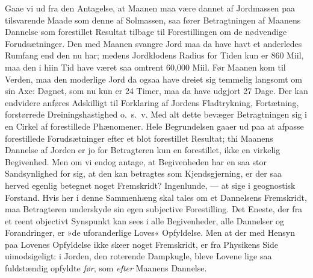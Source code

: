 \documentclass[12pt]{book}
\newcommand{\apage}[1]{\marginnote{\footnotesize\textit{[#1]}}}
\begin{document}
Gaae vi ud fra den Antagelse, at Maanen maa være dannet af Jordmassen paa
tilsvarende Maade som denne af Solmassen, saa fører Betragtningen af
Maanens Dannelse som forestillet Resultat tilbage til Forestillingen om de
nødvendige Forudsætninger. Den med Maanen svangre Jord maa da have havt et
anderledes Rumfang end den nu har; medens Jordklodens Radius for Tiden kun
er 860 Miil, maa den i hiin Tid have været saa omtrent 60,000 Miil. Før
Maanen kom til Verden, maa den moderlige Jord da ogsaa have dreiet sig
temmelig langsomt om sin Axe: Døgnet, som nu kun er 24 Timer, maa da have
udgjort 27 Dage. Der kan endvidere anføres Adskilligt til Forklaring af
Jordens Fladtrykning, Fortætning, forstørrede Dreiningshastighed o.\ s.\ v. Med
alt dette bevæger Betragtningen sig i en Cirkel af forestillede Phænomener.
Hele Begrundelsen gaaer ud paa at afpasse forestillede Forudsætninger efter
et blot forestillet Resultat; thi Maanens Dannelse af Jorden er jo for
Betragteren kun en forestillet, ikke en virkelig Begivenhed. Men om vi
endog antage, at Begivenheden har en saa stor Sandsynlighed \apage{163} for sig, at den
kan betragtes som Kjendsgjerning, er der saa herved egenlig betegnet noget
Fremskridt? Ingenlunde, --- at sige i geognostisk Forstand. Hvis her i
denne Sammenhæng skal tales om et Dannelsens Fremskridt, maa Betragteren
underskyde sin egen subjective Forestilling. Det Eneste, der fra et reent
objectivt Synspunkt kan sees i alle Begivenheder, alle Dannelser og
Forandringer, er »de uforanderlige Loves« Opfyldelse. Men at der med Hensyn
paa Lovenes Opfyldelse ikke skeer noget Fremskridt, er fra Physikens Side
uimodsigeligt: i Jorden, den roterende Dampkugle, bleve Lovene lige saa
fuldstændig opfyldte \emph{før}, som \emph{efter} Maanens Dannelse.
\end{document}
